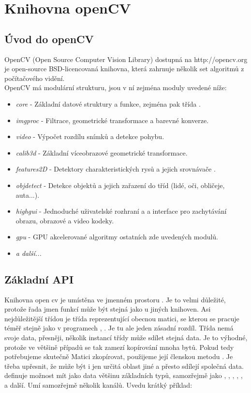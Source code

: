 \chapter{Knihovna openCV}
\label{kap:opencv}

\section{Úvod do openCV}
OpenCV (Open Source Computer Vision Library) dostupná na http://opencv.org \cite{opencv} je open-source BSD-licencovaná knihovna, která zahrnuje několik set algoritmů z počítačového vidění. 
\\
OpenCV má modulární strukturu, jsou v ní zejména moduly uvedené níže:

\begin{itemize}
\item \emph{core} - Základní datové struktury a funkce, zejména pak třída .
\item \emph{imgproc} - Filtrace, geometrické transformace a barevné konverze.
\item \emph{video} - Výpočet rozdílu snímků a detekce pohybu.
\item \emph{calib3d} - Základní víceobrazové geometrické transformace.
\item \emph{features2D} - Detektory charakteristických rysů a jejich srovnávače .
\item \emph{objdetect} - Detekce objektů a jejich zařazení do tříd (lidé, oči, obličeje, auta...).
\item \emph{highgui} - Jednoduché uživatelské rozhraní a a interface pro zachytávání obrazu, obrazové a video kodeky. 
\item \emph{gpu} - GPU akcelerované algoritmy ostatních zde uvedených modulů.
\item \emph{ a další...}
\end{itemize}


\section{Základní API}


Knihovna open cv je umístěna ve jmenném prostoru .
Je to velmi důležité, protože řada jmen funkcí může být stejná jako u jiných knihoven.
Asi nejdůležitější třídou je třída  reprezentující obecnou matici, se kterou se pracuje téměř stejně jako v programech , . Je tu ale jeden zásadní rozdíl. Třída nemá svoje data, přesněji, několik instancí třídy  
může sdílet stejná data. Je to výhodné, protože ve většině případů se tak zamezí kopírování mnoha bytů. Pokud tedy potřebujeme skutečně Matici zkopírovat, použijeme její členskou metodu .
Je třeba upřesnit, že  může být i jen určitá oblast jiné  a přesto sdílejí společná data.  definuje možnost mít jako data většinu základních typů, samozřejmě jako , , , , , a  další. Umí samozřejmě několik kanálů. Uvedu krátký příklad:


